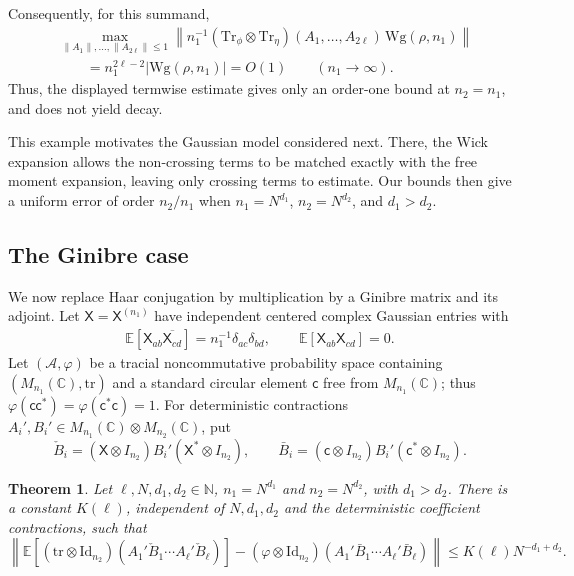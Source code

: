 \documentclass[12pt]{article}
\numberwithin{equation}{section}
\theoremstyle{plain}
\newtheorem{theorem}{Theorem}[section]
\def\bE{\mathbb E}
\def\bN{\mathbb N}
\def\bC{\mathbb C}
\def\id{\mathrm {Id}}
\def\Tr{\mathrm {Tr}}
\def\tr{\mathrm {tr}}
\def\Wg{\mathrm {Wg}}
\begin{document}
Consequently, for this summand,
\begin{align*}
&\max_{\|A_1\|,\ldots,\|A_{2\ell}\|\le1}
\left\|n_1^{-1}(\Tr_\phi\otimes\Tr_\eta)(A_1,\ldots,A_{2\ell})
\,\Wg(\rho,n_1)\right\|\\
&\qquad=n_1^{2\ell-2}|\Wg(\rho,n_1)|=O(1)
\qquad(n_1\to\infty).
\end{align*}
Thus, the displayed termwise estimate gives only an order-one bound at $n_2=n_1$, and does not yield decay.

This example motivates the Gaussian model considered next. There, the Wick expansion allows the non-crossing terms to be matched exactly with the free moment expansion, leaving only crossing terms to estimate. Our bounds then give a uniform error of order $n_2/n_1$ when $n_1=N^{d_1}$, $n_2=N^{d_2}$, and $d_1>d_2$.


\subsection{The Ginibre case}

We now replace Haar conjugation by multiplication by a Ginibre matrix and its adjoint. Let $\mathsf X=\mathsf X^{(n_1)}$ have independent centered complex Gaussian entries with
\begin{align} \label{eq-covariance-Gaussian entries}
\bE[\mathsf X_{ab}\overline{\mathsf X_{cd}}]=n_1^{-1}\delta_{ac}\delta_{bd},
\qquad \bE[\mathsf X_{ab}\mathsf X_{cd}]=0.
\end{align}
Let $(\mathcal A,\varphi)$ be a tracial noncommutative probability space containing $(M_{n_1}(\bC),\tr)$ and a standard circular element $\mathsf c$ free from $M_{n_1}(\bC)$; thus $\varphi(\mathsf c\mathsf c^*)=\varphi(\mathsf c^*\mathsf c)=1$. For deterministic contractions $A_i',B_i'\in M_{n_1}(\bC)\otimes M_{n_2}(\bC)$, put
\[
\check B_i=(\mathsf X\otimes I_{n_2})B_i'(\mathsf X^*\otimes I_{n_2}),
\qquad
\bar B_i=(\mathsf c\otimes I_{n_2})B_i'(\mathsf c^*\otimes I_{n_2}).
\]

\begin{theorem}\label{Thm-Ginibre-compare}
Let $\ell,N,d_1,d_2\in\bN$, $n_1=N^{d_1}$ and $n_2=N^{d_2}$, with $d_1>d_2$. There is a constant $K(\ell)$, independent of $N,d_1,d_2$ and the deterministic coefficient contractions, such that
\[
\left\|\bE[(\tr\otimes\id_{n_2})(A_1'\check B_1\cdots A_\ell'\check B_\ell)]
-(\varphi\otimes\id_{n_2})(A_1'\bar B_1\cdots A_\ell'\bar B_\ell)\right\|
\le K(\ell)N^{-d_1+d_2}.
\]
\end{theorem}
\end{document}
